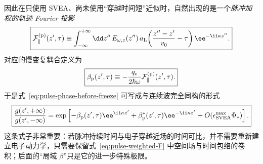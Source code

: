 因此在只使用 SVEA、尚未使用“穿越时间短”近似时，自然出现的是一个\emph{脉冲加权的轨迹 Fourier 投影}
\begin{equation}
\boxed{
\mathcal F_{\parallel}^{({\rm p})}(z',\tau)
\equiv
\int_{-\infty}^{+\infty}\dd z''\,
E_{\omega,z}(z'')\,
 a_{\rm L}\!\left(\frac{z''-z'}{v_0}-\tau\right)
\ee^{-\ii\kappa z''}.}
\label{eq:pulse-weighted-F}
\end{equation}
对应的慢变复耦合定义为
\begin{equation}
\boxed{
\beta_{\rm p}(z',\tau)
\equiv-\frac{q_{\rm e}}{2\hbar\omega}
\mathcal F_{\parallel}^{({\rm p})}(z',\tau).}
\label{eq:pulse-weighted-beta}
\end{equation}
于是式~\eqref{eq:pulse-phase-before-freeze} 可写成与连续波完全同构的形式
\begin{equation}
\boxed{
\frac{g(z',+\infty)}{g(z',-\infty)}
=
\exp\left[
-\beta_{\rm p}(z',\tau)\ee^{\ii\kappa z'}
+\beta_{\rm p}^*(z',\tau)\ee^{-\ii\kappa z'}
+O(\epsilon_{\rm SVEA}^{\max}\Phi_*)
\right].}
\label{eq:pulse-phase-beta-exact-svea}
\end{equation}
这条式子非常重要：若脉冲持续时间与电子穿越近场的时间可比，并不需要重新建立电子动力学，只需要保留式~\eqref{eq:pulse-weighted-F} 中空间场与时间包络的卷积；后面的“局域 $\beta$”只是它的进一步特殊极限。


